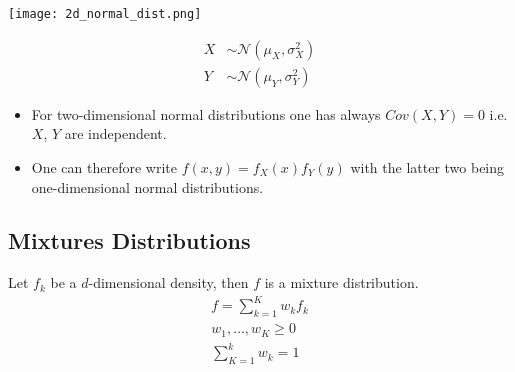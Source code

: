 \begin{center}
    \texttt{[image: 2d\_normal\_dist.png]}
\end{center}

\newpar{}
\begin{align*}
    X & \sim\mathcal{N}(\mu_X, \sigma_X^2) \\
    Y & \sim\mathcal{N}(\mu_Y, \sigma_Y^2)
\end{align*}


\begin{itemize}
    \item For two-dimensional normal distributions one has always $Cov(X,Y)=0$ i.e. $X$, $Y$ are independent.
    \item One can therefore write $f(x,y)=f_X(x)f_Y(y)$ with the latter two being one-dimensional normal distributions.
\end{itemize}

\subsection{Mixtures Distributions}
Let $f_k$ be a $d$-dimensional density, then $f$ is a mixture distribution.
\begin{gather*}
    f = \sum_{k=1}^{K} w_k f_k \\
    w_1, \ldots, w_K \geq 0 \\
    \sum_{K=1}^{k}w_k = 1
\end{gather*}
